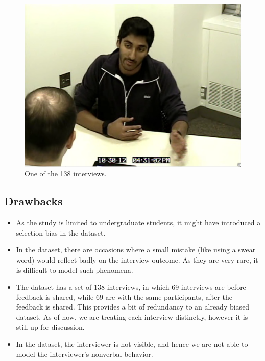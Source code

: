 \documentclass[11pt]{article}
\begin{document}
\begin{figure}[h!]
\begin{center}
\includegraphics[width=0.7\columnwidth]{figures/Screenshot from 2016-10-21 20-30-05/Screenshot from 2016-10-21 20-30-05}
\caption{One of the 138 interviews.}
\label{fig:dataset}
\end{center}
\end{figure}

\subsection{Drawbacks}
\begin{itemize}
 \item As the study is limited to undergraduate students, it might have introduced a selection bias in the dataset. 
 \item In the dataset, there are occasions where a small mistake (like using a swear word) would reflect badly on the interview outcome. As they are very rare, it is difficult to model such phenomena.
 \item The dataset has a set of 138 interviews, in which 69 interviews are before feedback is shared, while 69 are with the same participants, after the feedback is shared. This provides a bit of redundancy to an already biased dataset. As of now, we are treating each interview distinctly, however it is still up for discussion.
 \item In the dataset, the interviewer is not visible, and hence we are not able to model the interviewer’s nonverbal behavior.
\end{itemize}
\end{document}

